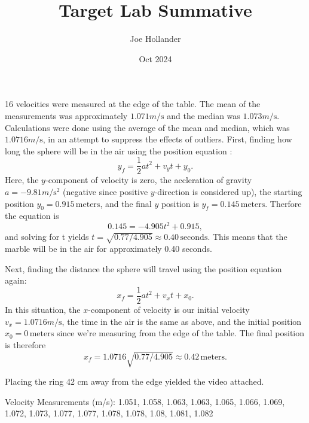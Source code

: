 \documentclass{article}
\title{Target Lab Summative}
\author{Joe Hollander}
\date{Oct 2024}
\begin{document}
\maketitle 


16 velocities were measured at the edge of the table. 
The mean of the measurements was approximately $1.071 \si{m\per\second}$ and the median was $1.073\si{m\per\second}$. 
Calculations were done using the average of the mean and median, which was $1.0716 \si{m\per\second}$, in an attempt to suppress the effects of outliers. 
First, finding how long the sphere will be in the air using the position equation :
\[
y_f = \frac{1}{2}at^2 + v_yt + y_0.
\]
Here, the $y$-component of velocity is zero,
the accleration of gravity $a = -9.81 \si{m\per\second^2}$ (negative since positive $y$-direction is considered up), the starting position $y_0 = 0.915 \, \text{meters}$,
and the final $y$ position is $y_f = 0.145  \, \text{meters}$.
Therfore the equation is 
\[
0.145 = -4.905t^2 + 0.915, 
\]
and solving for t yields 
$t = \sqrt{0.77/4.905} \approx 0.40 \, \text{seconds}.$
This means that the marble will be in the air for approximately 0.40 seconds. 

Next, finding the distance the sphere will travel using the position equation again:
\[
x_f = \frac{1}{2}at^2 + v_xt + x_0.
\]
In this situation, the $x$-component of velocity is our initial velocity $v_x = 1.0716 \si{m\per\second}$,
the time in the air is the same as above, 
and the initial position $x_0 = 0 \, \text{meters}$ since we're measuring from the edge of the table.
The final position is therefore 
\[
x_f = 1.0716\sqrt{0.77/4.905} \approx 0.42 \, \text{meters}. 
\]

Placing the ring 42 cm away from the edge yielded the video attached. 

\medskip

Velocity Measurements (m/s):
1.051, 1.058, 1.063, 1.063, 1.065, 1.066, 1.069, 1.072, 1.073, 1.077, 1.077, 1.078, 1.078, 1.08, 1.081, 1.082
\end{document}
